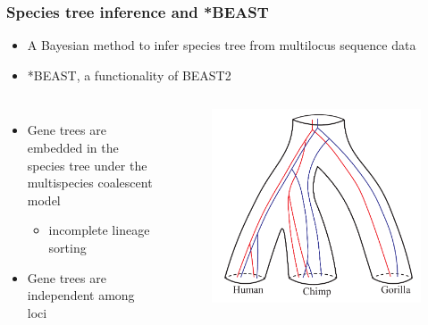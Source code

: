 \begin{frame}\frametitle{Species tree inference and *BEAST}
	\begin{itemize}
		\item A Bayesian method to infer species tree from multilocus sequence data \cite{Heled:2010ia}
		\item *BEAST, a functionality of BEAST2
	\end{itemize}
	\begin{columns}
	\column{4.6cm}
	\begin{itemize}
		\item Gene trees are embedded in the species tree under the multispecies coalescent model \cite{Rannala:2003vt}
		\begin{itemize}
			\item incomplete lineage sorting
		\end{itemize}
		\item Gene trees are independent among loci
	\end{itemize}
	\column{4.7cm}
    \begin{figure}[h!]
    	\includegraphics[width=1.0\textwidth]{figures/geneTreesInSpeciesTree}
  	\end{figure}
	\end{columns}
\end{frame}


